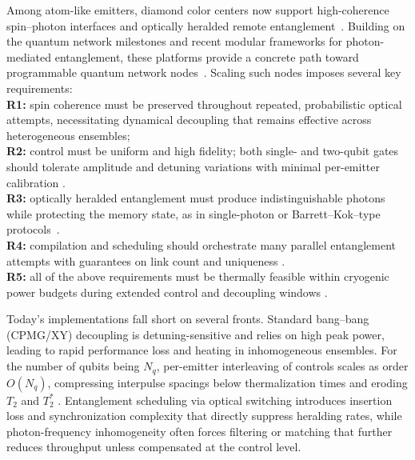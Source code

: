 \documentclass[%
 reprint,
 superscriptaddress,
 amsmath,amssymb,
 aps,
 prx,
]{revtex4-2}
\begin{document}
Among atom-like emitters, diamond color centers now support high-coherence spin–photon interfaces and optically heralded remote entanglement~\cite{beukers2024remote,Sukachev_2017,arjona2022photonic,knaut2024entanglement,iwasaki2017tin,parker2024diamond,rugar2021quantum}. Building on the quantum network milestones and recent modular frameworks for photon-mediated entanglement, these platforms provide a concrete path toward programmable quantum network nodes~\cite{barrett2005efficient,bernien2013heralded,hensen2015loophole,humphreys2018deterministic,pompili2021realization,doi:10.1126/science.add9771,beukers2024remote, PRXQuantum.5.010303}. Scaling such nodes imposes several key requirements:\\
\textbf{R1:} spin coherence must be preserved throughout repeated, probabilistic optical attempts, necessitating dynamical decoupling that remains effective across heterogeneous ensembles;\\
\textbf{R2:} control  must be uniform and high fidelity; both single- and two-qubit gates should tolerate amplitude and detuning variations with minimal per-emitter calibration \cite{Dong_2010}.\\
\textbf{R3:} optically heralded entanglement must produce indistinguishable photons while protecting the memory state, as in single-photon or Barrett–Kok–type protocols~\cite{Hermans_2023,barrett2005efficient,bernien2013heralded,pompili2021realization}.\\
\textbf{R4:} compilation and scheduling should orchestrate many parallel entanglement attempts with guarantees on link count and uniqueness \cite{maronese2021quantumcompiling,wang2024atomique,li2024dynamic,patil2022entanglement,kaur2023entanglement,humphreys2018deterministic}.\\
\textbf{R5:} all of the above requirements must be thermally feasible within cryogenic power budgets during extended control and decoupling windows \cite{krinner2019engineering}.

Today’s implementations fall short on several fronts. Standard bang–bang (CPMG/XY) decoupling \cite{Viola_1998} is detuning-sensitive and relies on high peak power, leading to rapid performance loss and heating in inhomogeneous ensembles. For the number of qubits being $N_q$, per-emitter interleaving of controls scales as order $O(N_q)$, compressing interpulse spacings below thermalization times and eroding $T_2$ and $T_2^*$ \cite{Sukachev_2017,nguyen2019integrated}. Entanglement scheduling via optical switching introduces insertion loss and synchronization complexity that directly suppress heralding rates, while photon-frequency inhomogeneity often forces filtering or matching that further reduces throughput unless compensated at the control level.
\end{document}

